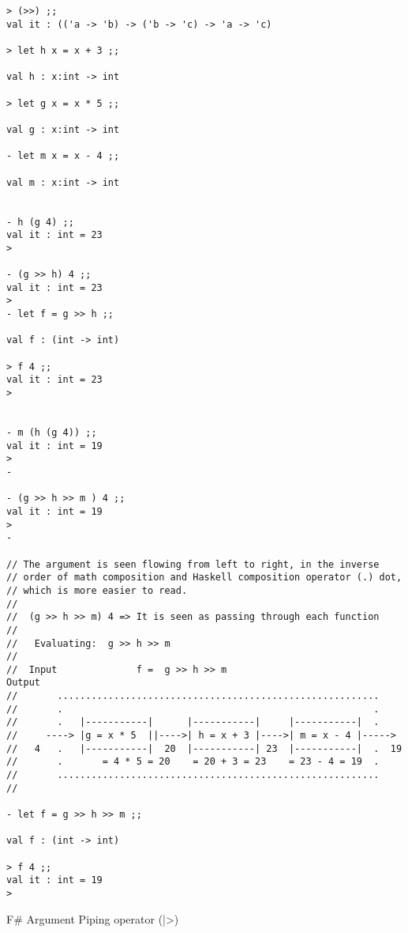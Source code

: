 \documentclass[11pt]{article}
\begin{document}
\begin{verbatim}
> (>>) ;;
val it : (('a -> 'b) -> ('b -> 'c) -> 'a -> 'c) 

> let h x = x + 3 ;;         

val h : x:int -> int

> let g x = x * 5 ;;

val g : x:int -> int

- let m x = x - 4 ;;

val m : x:int -> int


- h (g 4) ;;
val it : int = 23
> 

- (g >> h) 4 ;;
val it : int = 23
> 
- let f = g >> h ;;

val f : (int -> int)

> f 4 ;;
val it : int = 23
> 


- m (h (g 4)) ;;
val it : int = 19
> 
- 

- (g >> h >> m ) 4 ;;
val it : int = 19
> 
- 

// The argument is seen flowing from left to right, in the inverse
// order of math composition and Haskell composition operator (.) dot,
// which is more easier to read.  
//
//  (g >> h >> m) 4 => It is seen as passing through each function 
//
//   Evaluating:  g >> h >> m                    
//
//  Input              f =  g >> h >> m                          Output 
//       .........................................................
//       .                                                       .         
//       .   |-----------|      |-----------|     |-----------|  .
//     ----> |g = x * 5  ||---->| h = x + 3 |---->| m = x - 4 |----->
//   4   .   |-----------|  20  |-----------| 23  |-----------|  .  19 
//       .       = 4 * 5 = 20    = 20 + 3 = 23    = 23 - 4 = 19  . 
//       .........................................................
//

- let f = g >> h >> m ;;

val f : (int -> int)

> f 4 ;;
val it : int = 19
>
\end{verbatim}

F\# Argument Piping operator (|>) 
\end{document}
